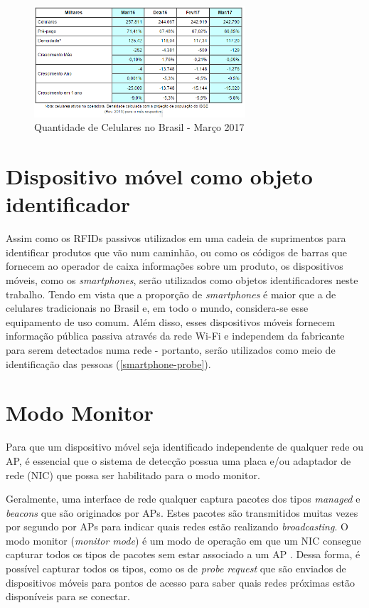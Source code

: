 \begin{figure}[!h]
  \caption{\label{dados2017}Quantidade de Celulares no Brasil - Março 2017}
  \begin{center}
    \includegraphics[width=0.7\textwidth]{img/dados2017.png}
  \end{center}
\end{figure}

\section{Dispositivo móvel como objeto identificador}
\label{dispositivo-coisa}
Assim como os RFIDs passivos utilizados em uma cadeia de suprimentos para identificar produtos que vão num caminhão, ou como os códigos de barras
que fornecem ao operador de caixa informações sobre um produto, os dispositivos móveis, como os \emph{smartphones}, serão utilizados
como objetos identificadores neste trabalho. Tendo em vista que a proporção de \emph{smartphones} é maior que a de celulares tradicionais no Brasil e, em
todo o mundo, considera-se esse equipamento de uso comum. Além disso, esses dispositivos móveis fornecem informação pública passiva
através da rede Wi-Fi e independem da fabricante para serem detectados numa rede - portanto, serão utilizados como meio
de identificação das pessoas (\autoref{smartphone-probe}).

\section{Modo Monitor}
\label{modo-monitor}
Para que um dispositivo móvel seja identificado independente de qualquer rede ou AP, é essencial que o sistema de detecção possua uma placa e/ou adaptador de rede (NIC) que possa ser habilitado para o modo monitor.

Geralmente, uma interface de rede qualquer captura pacotes dos tipos \emph{managed} e \emph{beacons} que são originados por APs. Estes pacotes são transmitidos
muitas vezes por segundo por APs para indicar quais redes estão realizando \emph{broadcasting}. O modo monitor (\emph{monitor mode}) é um modo de operação em que um NIC consegue capturar todos os tipos de pacotes sem estar associado a um AP \cite{Acrylic} \cite{Wireshark2017b}. Dessa forma, é possível capturar todos os tipos, como os de \emph{probe request} que são enviados de dispositivos móveis para pontos de acesso para saber quais redes próximas estão disponíveis para se conectar.

